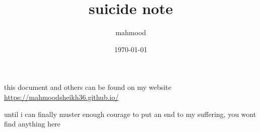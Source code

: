 \documentclass[a4paper,12pt]{article}
\author{mahmood}
\date{\today}
\title{suicide note}
\begin{document}
\maketitle
\begin{note}
this document and others can be found on my website\\
\url{https://mahmoodsheikh36.github.io/}
\end{note}
until i can finally muster enough courage to put an end to my suffering, you wont find anything here
\end{document}
